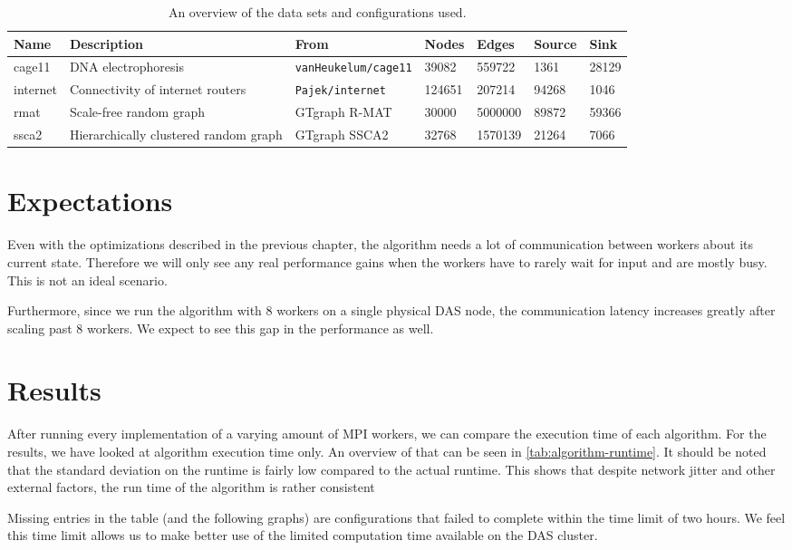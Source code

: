 \begin{table}
	\centering

	\begin{tabularx}{\textwidth}{l | X | l | l | l | l | l}
		Name & Description & From & Nodes & Edges & Source & Sink \\
		\hline
		cage11 & DNA electrophoresis & \texttt{vanHeukelum/cage11} & 39082 & 559722 & 1361 & 28129 \\
		internet & Connectivity of internet routers & \texttt{Pajek/internet} & 124651 & 207214 & 94268 & 1046 \\
		rmat & Scale-free random graph & GTgraph R-MAT & 30000 & 5000000 & 89872 & 59366 \\
		ssca2 & Hierarchically clustered random graph & GTgraph SSCA2 & 32768 & 1570139 & 21264 & 7066 \\
	\end{tabularx}
	\caption{An overview of the data sets and configurations used.}
	\label{tab:data-overview}
\end{table}


\section{Expectations}
Even with the optimizations described in the previous chapter, the algorithm needs a lot of communication between workers about its current state. Therefore we will only see any real performance gains when the workers have to rarely wait for input and are mostly busy. This is not an ideal scenario.

Furthermore, since we run the algorithm with 8 workers on a single physical DAS node, the communication latency increases greatly after scaling past 8 workers. We expect to see this gap in the performance as well.

\section{Results}
After running every implementation of a varying amount of MPI workers, we can compare the execution time of each algorithm. For the results, we have looked at algorithm execution time only. An overview of that can be seen in \autoref{tab:algorithm-runtime}. It should be noted that the standard deviation on the runtime is fairly low compared to the actual runtime. This shows that despite network jitter and other external factors, the run time of the algorithm is rather consistent

Missing entries in the table (and the following graphs) are configurations that failed to complete within the time limit of two hours. We feel this time limit allows us to make better use of the limited computation time available on the DAS cluster.

